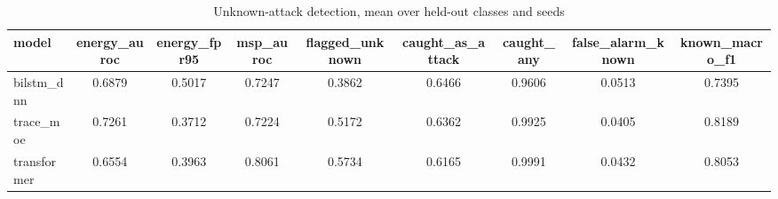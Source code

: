 \begin{table}[htbp]
\centering
\caption{Unknown-attack detection, mean over held-out classes and seeds}
\label{tab:zero_day_overall}
\begin{tabular}{lcccccccc}
\toprule
model & energy\_auroc & energy\_fpr95 & msp\_auroc & flagged\_unknown & caught\_as\_attack & caught\_any & false\_alarm\_known & known\_macro\_f1 \\
\midrule
bilstm\_dnn & 0.6879 & 0.5017 & 0.7247 & 0.3862 & 0.6466 & 0.9606 & 0.0513 & 0.7395 \\
trace\_moe & 0.7261 & 0.3712 & 0.7224 & 0.5172 & 0.6362 & 0.9925 & 0.0405 & 0.8189 \\
transformer & 0.6554 & 0.3963 & 0.8061 & 0.5734 & 0.6165 & 0.9991 & 0.0432 & 0.8053 \\
\bottomrule
\end{tabular}
\end{table}